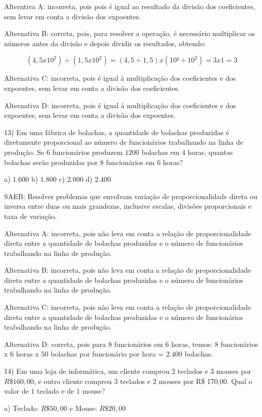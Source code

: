 Alterntiva A: incorreta, pois pois é igual ao resultado da divisão dos
coeficientes, sem levar em conta a divisão dos expoentes.

Alternativa B: correta, pois, para resolver a operação, é necessário
multiplicar os números antes da divisão e depois dividir os resultados,
obtendo:

$$(4,5 x 10^2) ÷ (1,5 x 10^2) = (4,5 ÷ 1,5) x (10² ÷ 10^2) = 3 x 1 = 3$$

Alternativa C: incorreta, pois é igual à multiplicação dos coeficientes
e dos expoentes, sem levar em conta a divisão dos coeficientes.

Alternativa D: incorreta, pois é igual à multiplicação dos coeficientes
e dos expoentes, sem levar em conta a divisão dos expoentes.

13) Em uma fábrica de bolachas, a quantidade de bolachas produzidas é
diretamente proporcional ao número de funcionários trabalhando na linha
de produção. Se $6$ funcionários produzem $1200$ bolachas em $4$ horas,
quantas bolachas serão produzidas por $8$ funcionários em $6$ horas?

a) $1.600$ b) $1.800$ c) $2.000$ d) $2.400$

SAEB: Resolver problemas que envolvam variação de proporcionalidade
direta ou inversa entre duas ou mais grandezas, inclusive escalas,
divisões proporcionais e taxa de variação.

Alternativa A: incorreta, pois não leva em conta a relação de
proporcionalidade direta entre a quantidade de bolachas produzidas e o
número de funcionários trabalhando na linha de produção.

Alternativa B: incorreta, pois não leva em conta a relação de
proporcionalidade direta entre a quantidade de bolachas produzidas e o
número de funcionários trabalhando na linha de produção.

Alternativa C: incorreta, pois não leva em conta a relação de
proporcionalidade direta entre a quantidade de bolachas produzidas e o
número de funcionários trabalhando na linha de produção.

Alternativa D: correta, pois para $8$ funcionários em $6$ horas, temos: $8$
funcionários x $6$ horas x $50$ bolachas por funcionário por hora = $2.400$
bolachas.

14) Em uma loja de informática, um cliente comprou $2$ teclados e $3$ mouses
por $R\$160,00$, e outro cliente comprou $3$ teclados e $2$ mouses por R\$
170,00. Qual o valor de $1$ teclado e de $1$ mouse?

a) Teclado: $R\$50,00$ e Mouse: $R\$20,00$

